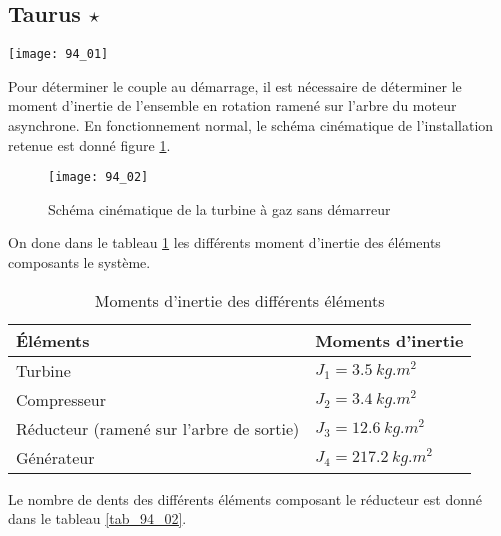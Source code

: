 \normaltrue \difficilefalse \tdifficilefalse
\correctionfalse


\subsection*{Taurus $\star$ \label{C2:06:94}}
\setcounter{question}{0}


\ifcorrection
\else
{}
\fi

\ifprof
\else

\begin{marginfigure}
\texttt{[image: 94\_01]}
\end{marginfigure}
Pour déterminer le couple au démarrage, il est nécessaire de déterminer le moment d’inertie de
 l’ensemble en rotation ramené sur l’arbre du moteur asynchrone.
 En fonctionnement normal, le schéma cinématique de l’installation retenue est donné figure \ref{fig_94_02}.
 

\begin{figure}[!h]
\texttt{[image: 94\_02]}
\caption{Schéma cinématique de la turbine à gaz sans démarreur \label{fig_94_02}}
\end{figure}

On done dans le tableau \ref{tab_94_01} les différents moment d'inertie des éléments composants le système.


\begin{table}[!h]
\begin{tabular}{ll}
\hline
Éléments & Moments d’inertie \\ \hline
 Turbine 	& $J_1= \SI{3,5}{kg.m^2}$ \\
 Compresseur 	& $J_2=\SI{3,4}{kg.m^2}$\\
 Réducteur (ramené sur l’arbre de sortie)&  $J_3=\SI{12,6}{kg.m^2}$\\
 Générateur 	& $J_4=\SI{217,2}{kg.m^2}$\\
 \hline
\end{tabular}
\caption{Moments d’inertie des différents éléments \label{tab_94_01}}
 \end{table}

 Le nombre de dents des différents éléments composant le réducteur est donné dans le tableau \ref{tab_94_02}.

